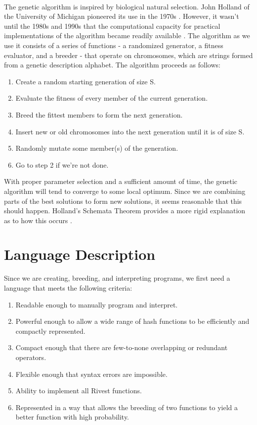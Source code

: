 \documentclass{article}
\begin{document}
\paragraph{}
The genetic algorithm is inspired by biological natural selection. John Holland of the University of Michigan pioneered its use in the 1970s \cite{Holland1973}.
However, it wasn't until the 1980s and 1990s that the computational capacity for practical implementations of the algorithm became readily available \cite{Goldberg}. The algorithm as we use it consists of a series of functions - a randomized generator, a fitness evaluator, and a breeder - that operate on chromosomes, which are strings formed from a genetic description alphabet. The algorithm proceeds as follows:
\begin{enumerate}
	\item Create a random starting generation of size S.
	\item Evaluate the fitness of every member of the current generation.
	\item Breed the fittest members to form the next generation.
	\item Insert new or old chromosomes into the next generation until it is of size S.
	\item Randomly mutate some member(s) of the generation.
	\item Go to step 2 if we're not done.
\end{enumerate}

With proper parameter selection and a sufficient amount of time, the genetic algorithm will tend to converge to some local optimum. Since we are combining parts of the best solutions to form new solutions, it seems reasonable that this should happen. Holland's Schemata Theorem provides a more rigid explanation as to how this occurs \cite{citeulike:1281572}.

\section{Language Description}
Since we are creating, breeding, and interpreting programs, we first need a language that meets the following criteria:

\begin{enumerate}
\item Readable enough to manually program and interpret.
\item Powerful enough to allow a wide range of hash functions to be efficiently and compactly represented.
\item Compact enough that there are few-to-none overlapping or redundant operators.
\item Flexible enough that syntax errors are impossible.
\item Ability to implement all Rivest functions.
\item Represented in a way that allows the breeding of two functions to yield a better function with high probability.
\end{enumerate}
\end{document}
